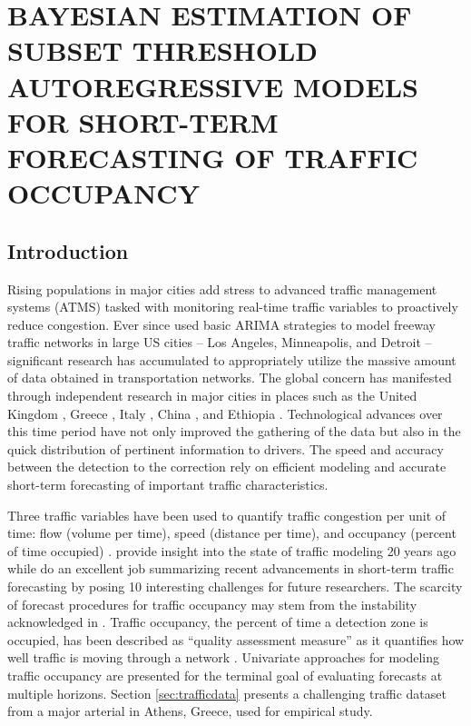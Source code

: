 \chapter{BAYESIAN ESTIMATION OF SUBSET THRESHOLD AUTOREGRESSIVE MODELS FOR SHORT-TERM FORECASTING OF TRAFFIC OCCUPANCY}
\label{chap:traffic}
\section{Introduction}
Rising populations in major cities add stress to advanced traffic management systems (ATMS) tasked with monitoring real-time traffic variables to proactively reduce congestion. Ever since \cite{Ahmed1979} used basic ARIMA strategies to model freeway traffic networks in large US cities -- Los Angeles, Minneapolis, and Detroit -- significant research has accumulated to appropriately utilize the massive amount of data obtained in transportation networks. The global concern has manifested through independent research in major cities in places such as the United Kingdom \citep{Queen2009,Dunne2012}, Greece \citep{Stathopoulos2003, Kamarianakis2012,Theofilatos2017}, Italy \citep{Annunziato2013,Moretti2015}, China \citep{Shang2006,Jun2007,Min2010}, and Ethiopia \citep{Hellendoorn2011}. Technological advances over this time period have not only improved the gathering of the data but also in the quick distribution of pertinent information to drivers. The speed and accuracy between the detection to the correction rely on efficient modeling and accurate short-term forecasting of important traffic characteristics.

Three traffic variables have been used to quantify traffic congestion per unit of time: flow (volume per time), speed (distance per time), and occupancy (percent of time occupied) \cite{Hall1992}. \cite{Smith1997} provide insight into the state of traffic modeling 20 years ago while \cite{Vlahogianni2014} do an excellent job summarizing recent advancements in short-term traffic forecasting by posing 10 interesting challenges for future researchers. The scarcity of forecast procedures for traffic occupancy may stem from the instability acknowledged in \cite{Levin1980}. Traffic occupancy, the percent of time a detection zone is occupied, has been described as ``quality assessment measure'' as it quantifies how well traffic is moving through a network \citep{Klein1996}. Univariate approaches for modeling traffic occupancy are presented for the terminal goal of evaluating forecasts at multiple horizons. Section \ref{sec:trafficdata}  presents a challenging traffic dataset from a major arterial in Athens, Greece, used for empirical study.

